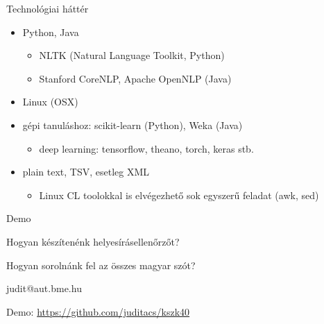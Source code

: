 \documentclass[xcolor=rgb]{beamer}
\begin{document}
\begin{frame}{Technológiai háttér}
    \begin{itemize}
            \pause
        \item Python, Java
            \pause
            \begin{itemize}
                \item NLTK (Natural Language Toolkit, Python)
                \item Stanford CoreNLP, Apache OpenNLP (Java)
            \end{itemize}
            \pause
        \item Linux (OSX)
            \pause
        \item gépi tanuláshoz: scikit-learn (Python), Weka (Java)
            \begin{itemize}
            \pause
                \item deep learning: tensorflow, theano, torch, keras stb.
            \end{itemize}
         \item plain text, TSV, esetleg XML
             \pause
             \begin{itemize}
                 \item Linux CL toolokkal is elvégezhető sok egyszerű feladat (awk, sed)
             \end{itemize}
    \end{itemize}
\end{frame}

\begin{frame}{Demo}

    \Large Hogyan készítenénk helyesírásellenőrzőt?

    \pause

    \vspace*{1cm}

    Hogyan sorolnánk fel az összes magyar szót?
\end{frame}

\begin{frame}
    \begin{center}
        judit@aut.bme.hu

        \vspace*{2cm}

        Demo: \url{https://github.com/juditacs/kszk40}
    \end{center}
\end{frame}
\end{document}
